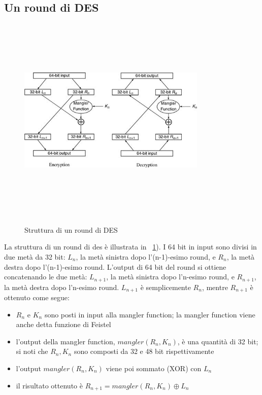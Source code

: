 \subsection{Un round di DES}
\begin{figure}[htbp]
	\centering%
	\subfigure%
	{\includegraphics[height=10cm, width=9cm, keepaspectratio]{Immagini/Capitolo2/round_des.png}}
	\caption{Struttura di un round di DES \label{fig:round_des}} 	
\end{figure}
La struttura di un round di des è illustrata in \figurename ~\ref{fig:round_des}). I 64 bit in input sono divisi in due metà da 32 bit: $L_{n}$, la metà sinistra dopo l'(n-1)-esimo round, e $R_{n}$, la metà destra dopo l'(n-1)-esimo round. L'output di 64 bit del round si ottiene concatenando le due metà: $L_{n + 1}$, la metà sinistra dopo l'n-esimo round, e $R_{n + 1}$, la metà destra dopo l'n-esimo round. $L_{n+1}$ è semplicemente $R_{n}$, mentre $R_{n + 1}$ è ottenuto come segue:
\begin{itemize}
  \item $R_{n}$ e $K_{n}$ sono posti in input alla mangler function; la mangler function viene anche detta funzione di Feistel
  \item l'output della mangler function, $mangler(R_{n}, K_{n})$, è una quantità di 32 bit; si noti che $R_{n}, K_{n}$ sono composti da
32 e 48 bit rispettivamente
  \item l'output $mangler(R_{n}, K_{n})$ viene poi sommato (XOR) con $L_{n}$
  \item il risultato ottenuto è $R_{n+1} = mangler(R_{n}, K_{n}) \oplus L_{n}$
\end{itemize}
